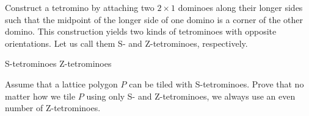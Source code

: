 Construct a tetromino by attaching two $2 \times 1$ dominoes along their longer sides such that the midpoint of the longer side of one domino is a corner of the other domino. This construction yields two kinds of tetrominoes with opposite orientations. Let us call them S- and Z-tetrominoes, respectively.

\begin{center}S-tetrominoes \qquad Z-tetrominoes\end{center}

Assume that a lattice polygon $P$ can be tiled with S-tetrominoes. Prove that no matter how we tile $P$ using only S- and Z-tetrominoes, we always use an even number of Z-tetrominoes.

